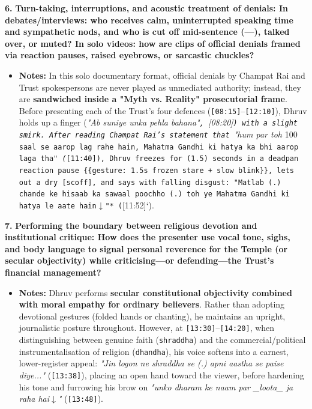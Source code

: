\documentclass[10pt,a4paper]{article}
\begin{document}
\noindent\textbf{6.} \textbf{Turn-taking, interruptions, and acoustic treatment of denials: In debates/interviews: who receives calm, uninterrupted speaking time and sympathetic nods, and who is cut off mid-sentence (---), talked over, or muted? In solo videos: how are clips of official denials framed via reaction pauses, raised eyebrows, or sarcastic chuckles?}\par\smallskip
\begin{itemize}
  \item \textbf{Notes:}
In this solo documentary format, official denials by Champat Rai and Trust spokespersons are never played as unmediated authority; instead, they are \textbf{sandwiched inside a "Myth vs. Reality" prosecutorial frame}. Before presenting each of the Trust's four defences (\texttt{[08:15]}--\texttt{[12:10]}), Dhruv holds up a finger (\textit{"Ab suniye unka pehla bahana"\texttt{, }[08:20]\texttt{) with a slight smirk. After reading Champat Rai's statement that }"hum par toh }100\texttt{ saal se aarop lag rahe hain, Mahatma Gandhi ki hatya ka bhi aarop laga tha"\textit{ (}[11:40]\texttt{), Dhruv freezes for }(1.5)\texttt{ seconds in a deadpan reaction pause }\{\{gesture: 1.5s frozen stare + slow blink\}\}\texttt{, lets out a dry }[scoff]\texttt{, and says with falling disgust: }"Matlab (.) chande ke hisaab ka sawaal poochho (.) toh ye Mahatma Gandhi ki hatya le aate hain$\downarrow$"* (}[11:52]`).\par\smallskip
\end{itemize}

\noindent\textbf{7.} \textbf{Performing the boundary between religious devotion and institutional critique: How does the presenter use vocal tone, sighs, and body language to signal personal reverence for the Temple (or secular objectivity) while criticising---or defending---the Trust's financial management?}\par\smallskip
\begin{itemize}
  \item \textbf{Notes:}
Dhruv performs \textbf{secular constitutional objectivity combined with moral empathy for ordinary believers}. Rather than adopting devotional gestures (folded hands or chanting), he maintains an upright, journalistic posture throughout. However, at \texttt{[13:30]}--\texttt{[14:20]}, when distinguishing between genuine faith (\texttt{shraddha}) and the commercial/political instrumentalisation of religion (\texttt{dhandha}), his voice softens into a earnest, lower-register appeal: \textit{"Jin logon ne shraddha se (.) apni aastha se paise diye..."} (\texttt{[13:38]}), placing an open hand toward the viewer, before hardening his tone and furrowing his brow on \textit{"unko dharam ke naam par \_loota\_ ja raha hai$\downarrow$"} (\texttt{[13:48]}).\par\smallskip
\end{itemize}
\end{document}
